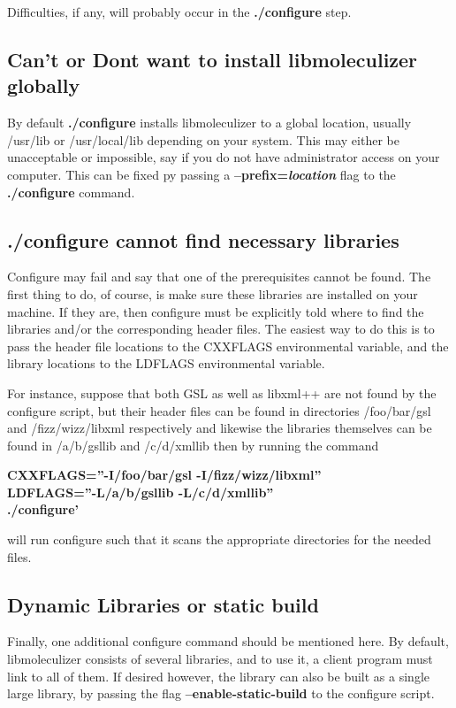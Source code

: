 Difficulties, if any, will probably occur in the {\bf ./configure} step.  

\subsection{Can't or Dont want to install libmoleculizer globally}
By default {\bf ./configure} installs libmoleculizer to a global
location, usually /usr/lib or /usr/local/lib depending on your
system.  This may either be unacceptable or impossible, say if you do
not have administrator access on your computer.  This can be fixed py
passing a {\bf --prefix=\emph{location}} flag to the {\bf ./configure}
command.  

\subsection{./configure cannot find necessary libraries}
Configure may fail and say that one of the prerequisites cannot be
found.  The first thing to do, of course, is make sure these libraries
are installed on your machine.  If they are, then configure must be
explicitly told where to find the libraries and/or the corresponding
header files. The easiest way to do this is to pass the header file
locations to the CXXFLAGS environmental variable, and the library
locations to the LDFLAGS environmental variable.  

For instance, suppose that both GSL as well as libxml++ are not found
by the configure script, but their header files can be found in
directories /foo/bar/gsl and /fizz/wizz/libxml respectively and
likewise the libraries themselves can be found in /a/b/gsllib and
/c/d/xmllib then by running the command 

{\bf CXXFLAGS=''-I/foo/bar/gsl
  -I/fizz/wizz/libxml'' \\
LDFLAGS=''-L/a/b/gsllib -L/c/d/xmllib'' \\
  ./configure'} 

will run configure such that it scans the appropriate
  directories for the needed files.  

\subsection{Dynamic Libraries or static build}
Finally, one additional configure command should be mentioned here.
By default, libmoleculizer consists of several libraries, and to use
it, a client program must link to all of them.  If desired however,
the library can also be built as a single large library, by passing
the flag {\bf --enable-static-build} to the configure script.
